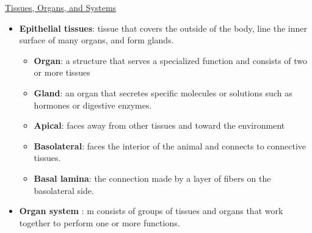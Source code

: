 \documentclass[12pt,letterpaper]{article}
\begin{document}
\begin{secbox}{\hyperlink{39}{Tissues, Organs, and Systems}}
{\begin{itemize}
\begin{itemize}
            \item \textbf{Cardiac muscle}: makes up the walls of the heart and is responsible for pumping blood throughout the body. The branching pattern of cardiac muscle allows electrical signals to spread throughout all cells of the heart, resulting in their coordinated contraction and relaxation.
            \item \textbf{Smooth muscle}: cells, which are tapered at each end, form a muscle tissue that lines the walls of the digestive tract and the blood vessels.
            \par {}
        \end{itemize}
        \item \textbf{Epithelial tissues}: tissue that covers the outside of the body, line the inner surface of many organs, and form glands.
        \begin{itemize}
            \item \textbf{Organ}: a structure that serves a specialized function and consists of two or more tissues
            \item \textbf{Gland}: an organ that secretes specific molecules or solutions such as hormones or digestive enzymes.
            \item \textbf{Apical}: faces away from other tissues and toward the environment
            \item \textbf{Basolateral}: faces the interior of the animal and connects to connective tissues.
            \item \textbf{Basal lamina}: the connection made by a layer of fibers on the basolateral side.
        \end{itemize}
        \item \textbf{Organ system }: m consists of groups of tissues and organs that work together to perform one or more functions.
    \end{itemize}
}\end{secbox}
\end{document}
